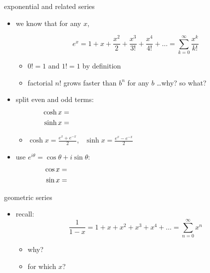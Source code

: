 \documentclass[dvipsnames,colorlinks]{beamer}
\begin{document}
\begin{frame}{exponential and related series}

\begin{itemize}
\item we know that for any $x$,

\vspace{-2mm}
    $$e^x = 1 + x + \frac{x^2}{2} + \frac{x^3}{3!} + \frac{x^4}{4!} + \dots = \sum_{k=0}^\infty \frac{x^k}{k!}$$

\vspace{-3mm}
    \begin{itemize}
    \item $0!=1$ and $1!=1$ by definition
    \item factorial $n!$ grows faster than $b^n$ for any $b$ \dots why? so what?
    \end{itemize}
\item split even and odd terms:
\begin{align*}
\cosh x &= \hspace{80mm} \\
\sinh x &=
\end{align*}

\vspace{-3mm}
    \begin{itemize}
    \item $\displaystyle \cosh x = \frac{e^x+e^{-x}}{2}$, \, $\displaystyle \sinh x = \frac{e^x-e^{-x}}{2}$
    \end{itemize}
\item use $e^{i\theta} = \cos\theta + i \sin\theta$:
\begin{align*}
\cos x &= \hspace{80mm} \\
\sin x &=
\end{align*}
    
\end{itemize}
\end{frame}


\begin{frame}{geometric series}

\begin{itemize}
\item recall:
    $$\frac{1}{1-x} = 1 + x + x^2 + x^3 + x^4 + \dots = \sum_{n=0}^\infty x^n$$

\vspace{-3mm}
    \begin{itemize}
    \item why?

\vspace{20mm}
    \item for which $x$?
    \end{itemize}

\vspace{20mm}
\end{itemize}
\end{frame}
\end{document}

